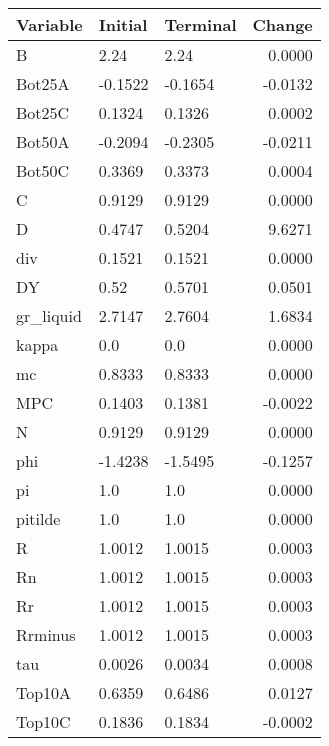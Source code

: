 \begin{table}
\centering
\label{tab:stst_comparison_low_B_limit_permanent_asymmetric}
\begin{tabular}{lllr}
\toprule
                Variable & Initial & Terminal &  Change \\
\midrule
                       B &    2.24 &     2.24 &  0.0000 \\
                  Bot25A & -0.1522 &  -0.1654 & -0.0132 \\
                  Bot25C &  0.1324 &   0.1326 &  0.0002 \\
                  Bot50A & -0.2094 &  -0.2305 & -0.0211 \\
                  Bot50C &  0.3369 &   0.3373 &  0.0004 \\
                       C &  0.9129 &   0.9129 &  0.0000 \\
                       D &  0.4747 &   0.5204 &  9.6271 \\
                     div &  0.1521 &   0.1521 &  0.0000 \\
                      DY &    0.52 &   0.5701 &  0.0501 \\
               gr\_liquid &  2.7147 &   2.7604 &  1.6834 \\
                   kappa &     0.0 &      0.0 &  0.0000 \\
                      mc &  0.8333 &   0.8333 &  0.0000 \\
                     MPC &  0.1403 &   0.1381 & -0.0022 \\
                       N &  0.9129 &   0.9129 &  0.0000 \\
                     phi & -1.4238 &  -1.5495 & -0.1257 \\
                      pi &     1.0 &      1.0 &  0.0000 \\
                 pitilde &     1.0 &      1.0 &  0.0000 \\
                       R &  1.0012 &   1.0015 &  0.0003 \\
                      Rn &  1.0012 &   1.0015 &  0.0003 \\
                      Rr &  1.0012 &   1.0015 &  0.0003 \\
                 Rrminus &  1.0012 &   1.0015 &  0.0003 \\
                     tau &  0.0026 &   0.0034 &  0.0008 \\
                  Top10A &  0.6359 &   0.6486 &  0.0127 \\
                  Top10C &  0.1836 &   0.1834 & -0.0002 \\

\end{tabular}
\end{table}

